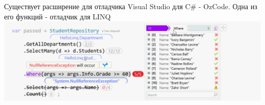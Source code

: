 \begin{frame}
\frametitle{\insertsection} 
\framesubtitle{\insertsubsection}
Существует расширение для отладчика Visual Studio для C\# - OzCode. Одна из его функций - отладчик для LINQ
\includegraphics[scale=0.35]{img/ozcode.png}
\end{frame}
